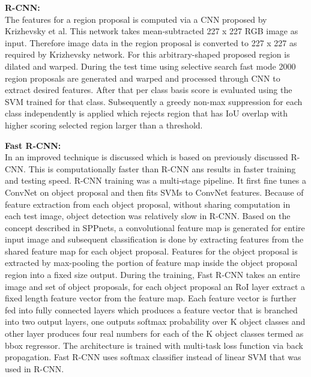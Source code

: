 \newpara \textbf{R-CNN:} \\
The features for a region proposal is computed via a CNN proposed by Krizhevsky et al. This network takes mean-subtracted 227 x 227 RGB image as input. Therefore image data in the region proposal is converted to 227 x 227 as required by Krizhevsky network. For this arbitrary-shaped  proposed region is dilated and warped. During the test time using selective search fast mode 2000 region proposals are generated and warped and processed through CNN to extract desired features. After that per class basis score is evaluated using the SVM trained for that class. Subsequently a greedy non-max suppression for each class independently is applied which rejects region that has IoU overlap with higher scoring selected region larger than a threshold.

\newpara \textbf{Fast R-CNN:} \\
In \cite{girshick2015fast} an improved technique is discussed which is based on previously discussed R-CNN. This is computationally faster than R-CNN ans results in faster training and testing speed. R-CNN training was a multi-stage pipeline. It first fine tunes a ConvNet on object proposal and then fits SVMs to ConvNet features. Because of feature extraction from each object proposal, without sharing computation in each test image, object detection was relatively slow in R-CNN. Based on the concept described in SPPnets, a convolutional feature map is generated for entire input image and subsequent classification is done by extracting features from the shared feature map for each object proposal. Features for the object proposal is extracted by max-pooling the portion of feature map inside the  object proposal region into a fixed size output. During the training, Fast R-CNN takes an entire image and set of object proposals, for each object proposal an RoI layer extract a fixed length feature vector from the feature map. Each feature vector is further fed into fully connected layers which produces a feature vector that is branched into two output layers, one outputs softmax probability over K object classes and other layer produces four real numbers for each of the K object classes termed as bbox regressor. The architecture is trained with multi-task loss function via back propagation. Fast R-CNN uses softmax classifier instead of linear SVM that was used in R-CNN.

